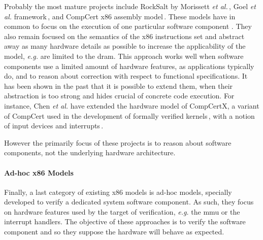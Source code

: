 Probably the most mature projects include RockSalt by Morissett \emph{et
  al.}\,\cite{morrisett2012rocksalt}, Goel \emph{et al.}
framework\,\cite{goel2014x86}, and CompCert x86 assembly
model\,\cite{leroy2012compcert}.
%
These models have in common to focus on the execution of one particular software
component . They also remain focused on the semantics of the x86 instructions
set and abstract away as many hardware details as possible to increase the
applicability of the model, \emph{e.g.} are limited to the \ac{dram}.
%
This approach works well when software components use a limited amount of
hardware features, as applications typically do, and to reason about correction
with respect to functional specifications.
%
It has been shown in the past that it is possible to extend them, when their
abstraction is too strong and hides crucial 
of concrete code execution.
%
For instance, Chen \emph{et al.} have extended the hardware model of CompCertX,
a variant of CompCert used in the development of formally verified
kernels\,\cite{gu2016certikos}, with a notion of input devices and
interrupts\,\cite{chen2018interrupt}.

However the primarily focus of these projects is to reason about software
components, not the underlying hardware architecture.

\paragraph{Ad-hoc x86 Models}
%
Finally, a last category of existing
x86 models is ad-hoc models, specially developed to verify a dedicated system
software component.
%
As such, they focus on hardware features used by the target of verification,
\emph{e.g.} the \ac{mmu} or the interrupt handlers. The objective of these
approaches is to verify the software component and so they suppose the hardware
will behave as expected. 

